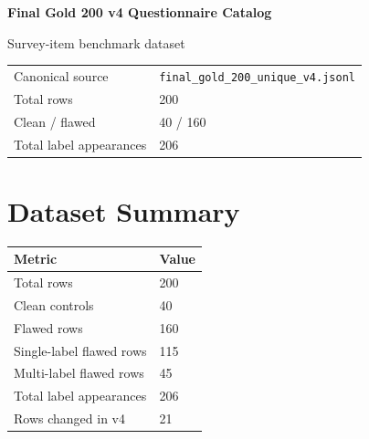 \documentclass[10pt,a4paper]{article}
\begin{document}
\begin{titlepage}
\centering
\vspace*{2.2cm}
{\Huge\bfseries Final Gold 200 v4 Questionnaire Catalog\par}
\vspace{0.9cm}
{\Large Survey-item benchmark dataset\par}
\vspace{1.6cm}
\begin{tabular}{@{}ll@{}}
Canonical source & \texttt{final\_gold\_200\_unique\_v4.jsonl}\\
Total rows & 200\\
Clean / flawed & 40 / 160\\
Total label appearances & 206\\
\end{tabular}
\vfill
\end{titlepage}
\tableofcontents
\newpage
{}
\section{Dataset Summary}
\begin{tabularx}{\linewidth}{@{}lX@{}}
\toprule
Metric & Value\\
\midrule
Total rows & 200\\
Clean controls & 40\\
Flawed rows & 160\\
Single-label flawed rows & 115\\
Multi-label flawed rows & 45\\
Total label appearances & 206\\
Rows changed in v4 & 21\\
\bottomrule
\end{tabularx}
\end{document}
